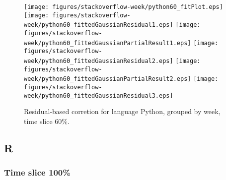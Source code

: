 \begin{figure}[hb]
\centering
{}
{\texttt{[image: figures/stackoverflow-week/python60\_fitPlot.eps]}}
{\texttt{[image: figures/stackoverflow-week/python60\_fittedGaussianResidual1.eps]}}
{\texttt{[image: figures/stackoverflow-week/python60\_fittedGaussianPartialResult1.eps]}}
{\texttt{[image: figures/stackoverflow-week/python60\_fittedGaussianResidual2.eps]}}
{\texttt{[image: figures/stackoverflow-week/python60\_fittedGaussianPartialResult2.eps]}}
{\texttt{[image: figures/stackoverflow-week/python60\_fittedGaussianResidual3.eps]}}
\caption{Residual-based corretion for language Python, grouped by week, time slice 60\%.}
\end{figure}


\clearpage 
\newpage 


\subsection{R}

\FloatBarrier

\subsubsection{Time slice 100\%}

